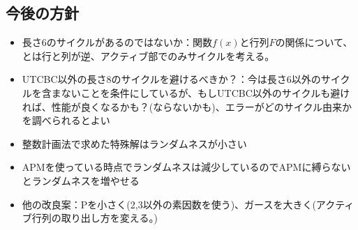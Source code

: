 \documentclass[a4paper,11pt,dvipdfmx]{jsarticle}
\theoremstyle{definition}
\begin{document}
\subsection{今後の方針}
\begin{itemize}
  \item 長さ6のサイクルがあるのではないか：関数$f(x)$と行列$F$の関係について、\cite{kasai2025quantum}とは行と列が逆、アクティブ部でのみサイクルを考える。
  \item UTCBC以外の長さ8のサイクルを避けるべきか？：今は長さ6以外のサイクルを含まないことを条件にしているが、もしUTCBC以外のサイクルも避ければ、性能が良くなるかも？(ならないかも)、エラーがどのサイクル由来かを調べられるとよい
  \item 整数計画法で求めた特殊解はランダムネスが小さい
  \item APMを使っている時点でランダムネスは減少しているのでAPMに縛らないとランダムネスを増やせる
  \item 他の改良案：Pを小さく(2,3以外の素因数を使う)、ガースを大きく(アクティブ行列の取り出し方を変える。)
\end{itemize}
\end{document}
